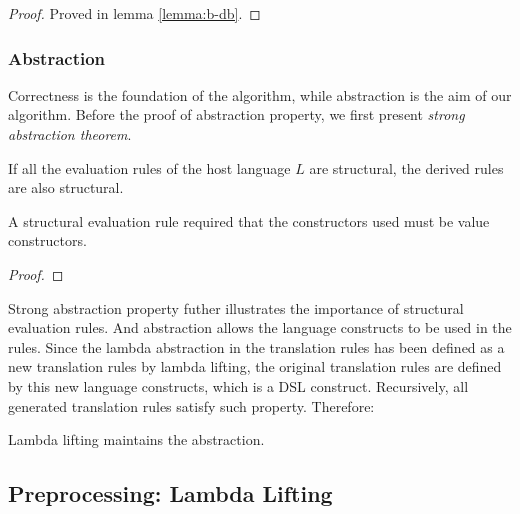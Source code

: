 \begin{proof}
  Proved in lemma \ref{lemma:b-db}.
\end{proof}

\subsubsection{Abstraction}

Correctness is the foundation of the algorithm,
 while abstraction is the aim of our algorithm.
Before the proof of abstraction property,
 we first present \textit{strong abstraction theorem}.


\begin{theorem}
  If all the evaluation rules of the host language $L$ are structural,
  the derived rules are also structural.
\end{theorem}

A structural evaluation rule required that the constructors used must be value constructors.

\begin{proof}
  
\end{proof}

Strong abstraction property futher illustrates the importance of structural evaluation rules.
And abstraction allows the language constructs to be used in the rules.
Since the lambda abstraction in the translation rules has been defined as a new translation rules by lambda lifting, 
 the original translation rules are defined by this new language constructs, which is a DSL construct.
Recursively, all generated translation rules satisfy such property.
Therefore:

\begin{theorem}
  Lambda lifting maintains the abstraction.
\end{theorem}



\subsection{Preprocessing: Lambda Lifting}

